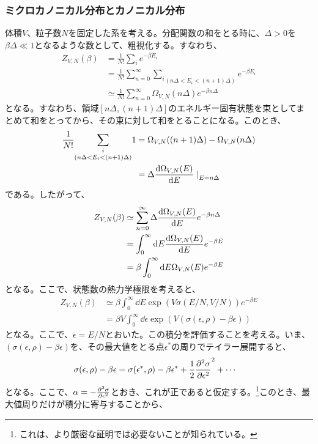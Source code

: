\documentclass[a4paper,11pt]{jsarticle}
\numberwithin{equation}{section}
\begin{document}
\subsubsection{ミクロカノニカル分布とカノニカル分布}
体積$V$、粒子数$N$を固定した系を考える。分配関数の和をとる時に、$\Delta > 0$を$\beta \Delta \ll 1$となるような数として、粗視化する。すなわち、
\begin{align}
  Z_{V,N}(\beta) &= \frac{1}{N!}\sum_{i}e^{-\beta E_{i}}\\
  &= \frac{1}{N!}\sum_{n=0}^{\infty}\underset{(n\Delta < E_i < (n+1)\Delta)}{\sum_{i}}e^{-\beta E_{i}}\\
  &\simeq \frac{1}{N!}\sum_{n=0}^{\infty}\Omega_{V,N}(n\Delta)e^{-\beta n\Delta}
\end{align}
となる。すなわち、領域$[n\Delta,(n+1)\Delta]$のエネルギー固有状態を束としてまとめて和をとってから、その束に対して和をとることになる。このとき、
\begin{align}
  \frac{1}{N!}\underset{(n\Delta < E_i < (n+1)\Delta)}{\sum_{i}} 1 &= \Omega_{V,N}((n+1)\Delta) - \Omega_{V,N}(n\Delta)\\
  &= \Delta \dv{\Omega_{V,N}(E)}{E}\left.\right|_{E=n\Delta}
\end{align}
である。したがって、
\begin{align}
  Z_{V,N}(\beta) &\simeq \sum_{n=0}^{\infty}\Delta\dv{\Omega_{V,N}(E)}{E}e^{-\beta n\Delta}\\
  &= \int_{0}^{\infty}\dd E \dv{\Omega_{V,N}(E)}{E}e^{-\beta E} \label{eq:canlap}\\
  &= \beta \int_{0}^{\infty}\dd E \Omega_{V,N}(E)e^{-\beta E}
\end{align}
となる。ここで、状態数の熱力学極限を考えると、
\begin{align}
  Z_{V,N}(\beta) &\simeq \beta \int_{0}^{\infty}\dd E \exp(V\sigma(E/N,V/N))e^{-\beta E}\\
  &= \beta V \int_{0}^{\infty}\dd \epsilon \exp(V(\sigma(\epsilon,\rho)-\beta \epsilon))
\end{align}
となる。ここで、$\epsilon = E/N$とおいた。この積分を評価することを考える。いま、$(\sigma(\epsilon,\rho)-\beta \epsilon)$を、その最大値をとる点$\epsilon^{*}$の周りでテイラー展開すると、
\begin{align}
  \sigma(\epsilon,\rho)-\beta \epsilon &= \sigma(\epsilon^{*},\rho)-\beta \epsilon^{*} + \frac{1}{2}\pdv[2]{\sigma}{\epsilon}(\epsilon-\epsilon^{*})^2 + \cdots
\end{align}
となる。ここで、$\alpha = -\pdv[2]{\sigma}{\epsilon}$とおき、これが正であると仮定する。\footnote{これは、より厳密な証明では必要ないことが知られている。}このとき、最大値周りだけが積分に寄与することから、
\end{document}
